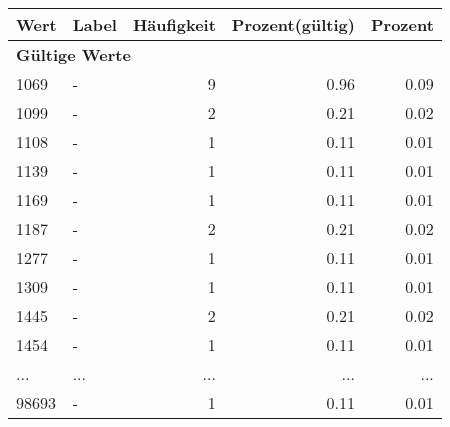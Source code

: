      \begin{longtable}{lXrrr}
     \toprule
     \textbf{Wert} & \textbf{Label} & \textbf{Häufigkeit} & \textbf{Prozent(gültig)} & \textbf{Prozent} \\
     \endhead
     \midrule
     \multicolumn{5}{l}{\textbf{Gültige Werte}}\\
        1069 & \multicolumn{1}{X}{-} & %
          \num{9} &
          \num[round-mode=places,round-precision=2]{0.96} &
          \num[round-mode=places,round-precision=2]{0.09} \\
        1099 & \multicolumn{1}{X}{-} & %
          \num{2} &
          \num[round-mode=places,round-precision=2]{0.21} &
          \num[round-mode=places,round-precision=2]{0.02} \\
        1108 & \multicolumn{1}{X}{-} & %
          \num{1} &
          \num[round-mode=places,round-precision=2]{0.11} &
          \num[round-mode=places,round-precision=2]{0.01} \\
        1139 & \multicolumn{1}{X}{-} & %
          \num{1} &
          \num[round-mode=places,round-precision=2]{0.11} &
          \num[round-mode=places,round-precision=2]{0.01} \\
        1169 & \multicolumn{1}{X}{-} & %
          \num{1} &
          \num[round-mode=places,round-precision=2]{0.11} &
          \num[round-mode=places,round-precision=2]{0.01} \\
        1187 & \multicolumn{1}{X}{-} & %
          \num{2} &
          \num[round-mode=places,round-precision=2]{0.21} &
          \num[round-mode=places,round-precision=2]{0.02} \\
        1277 & \multicolumn{1}{X}{-} & %
          \num{1} &
          \num[round-mode=places,round-precision=2]{0.11} &
          \num[round-mode=places,round-precision=2]{0.01} \\
        1309 & \multicolumn{1}{X}{-} & %
          \num{1} &
          \num[round-mode=places,round-precision=2]{0.11} &
          \num[round-mode=places,round-precision=2]{0.01} \\
        1445 & \multicolumn{1}{X}{-} & %
          \num{2} &
          \num[round-mode=places,round-precision=2]{0.21} &
          \num[round-mode=places,round-precision=2]{0.02} \\
        1454 & \multicolumn{1}{X}{-} & %
          \num{1} &
          \num[round-mode=places,round-precision=2]{0.11} &
          \num[round-mode=places,round-precision=2]{0.01} \\
       ... & ... & ... & ... & ... \\
        98693 & \multicolumn{1}{X}{-} & %
          \num{1} &
          \num[round-mode=places,round-precision=2]{0.11} &
          \num[round-mode=places,round-precision=2]{0.01} \\


\end{longtable}
